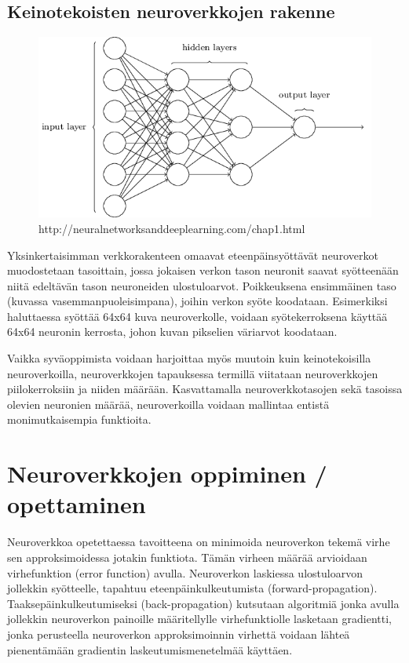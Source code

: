 \documentclass[11pt]{article}
\theoremstyle{plain}
\theoremstyle{definition}
\begin{document}
  \subsection{Keinotekoisten neuroverkkojen rakenne}

  \begin{figure}[h]
  \label{pic:neuralnet}
  \centering
  \includegraphics[scale=0.5]{basic-neuralnet}
  \caption{http://neuralnetworksanddeeplearning.com/chap1.html}
  \end{figure}

  Yksinkertaisimman verkkorakenteen omaavat eteenpäinsyöttävät neuroverkot muodostetaan tasoittain, jossa jokaisen verkon tason neuronit saavat syötteenään niitä edeltävän tason neuroneiden ulostuloarvot. Poikkeuksena ensimmäinen taso (kuvassa vasemmanpuoleisimpana), joihin verkon syöte koodataan. Esimerkiksi haluttaessa syöttää 64x64 kuva neuroverkolle, voidaan syötekerroksena käyttää 64x64 neuronin kerrosta, johon kuvan pikselien väriarvot koodataan.

  Vaikka syväoppimista voidaan harjoittaa myös muutoin kuin keinotekoisilla neuroverkoilla, neuroverkkojen tapauksessa termillä viitataan neuroverkkojen piilokerroksiin ja niiden määrään. Kasvattamalla neuroverkkotasojen sekä tasoissa olevien neuronien määrää, neuroverkoilla voidaan mallintaa entistä monimutkaisempia funktioita.

  \section{Neuroverkkojen oppiminen / opettaminen}
  Neuroverkkoa opetettaessa tavoitteena on minimoida neuroverkon tekemä virhe sen approksimoidessa jotakin funktiota. Tämän virheen määrää arvioidaan virhefunktion (error function) avulla. Neuroverkon laskiessa ulostuloarvon jollekkin syötteelle, tapahtuu eteenpäinkulkeutumista (forward-propagation). Taaksepäinkulkeutumiseksi (back-propagation) kutsutaan algoritmiä jonka avulla jollekkin neuroverkon painoille määritellylle virhefunktiolle lasketaan gradientti, jonka perusteella neuroverkon approksimoinnin virhettä voidaan lähteä pienentämään gradientin laskeutumismenetelmää käyttäen.
\end{document}
